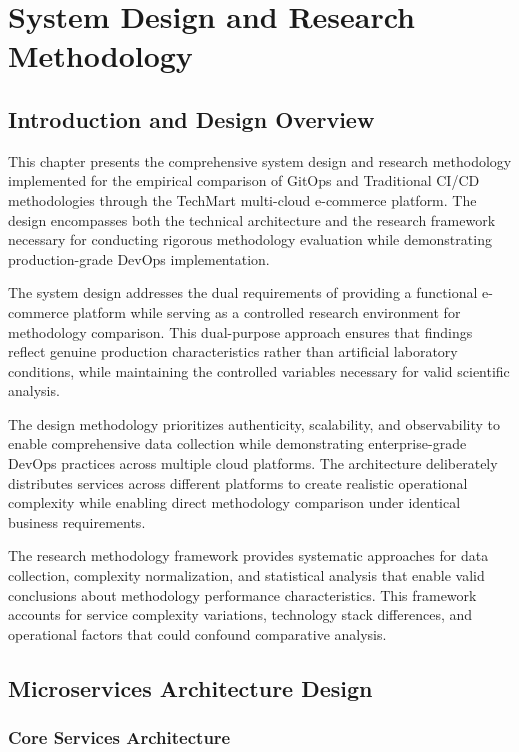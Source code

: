 \chapter{System Design and Research Methodology}

\section{Introduction and Design Overview}

This chapter presents the comprehensive system design and research methodology implemented for the empirical comparison of GitOps and Traditional CI/CD methodologies through the TechMart multi-cloud e-commerce platform. The design encompasses both the technical architecture and the research framework necessary for conducting rigorous methodology evaluation while demonstrating production-grade DevOps implementation.

The system design addresses the dual requirements of providing a functional e-commerce platform while serving as a controlled research environment for methodology comparison. This dual-purpose approach ensures that findings reflect genuine production characteristics rather than artificial laboratory conditions, while maintaining the controlled variables necessary for valid scientific analysis.

The design methodology prioritizes authenticity, scalability, and observability to enable comprehensive data collection while demonstrating enterprise-grade DevOps practices across multiple cloud platforms. The architecture deliberately distributes services across different platforms to create realistic operational complexity while enabling direct methodology comparison under identical business requirements.

The research methodology framework provides systematic approaches for data collection, complexity normalization, and statistical analysis that enable valid conclusions about methodology performance characteristics. This framework accounts for service complexity variations, technology stack differences, and operational factors that could confound comparative analysis.

\section{Microservices Architecture Design}

\subsection{Core Services Architecture}

